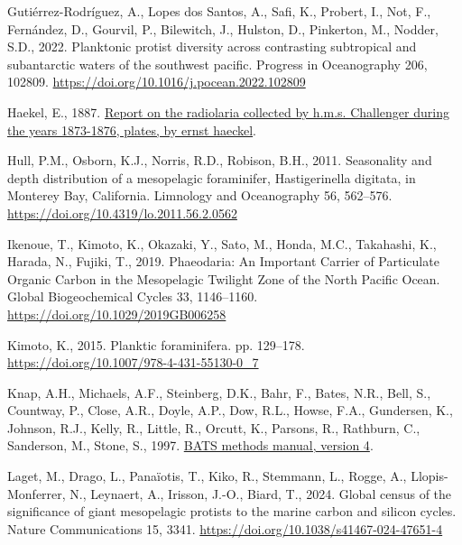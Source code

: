 \documentclass[
]{article}
\newlength{\cslhangindent}
\newlength{\cslentryspacingunit} %
\newenvironment{CSLReferences}[2] %
 {%
  \setlength{\parindent}{0pt}
  \ifodd #1
  \let\oldpar\par
  \def\par{\hangindent=\cslhangindent\oldpar}
  \fi
  \setlength{\parskip}{#2\cslentryspacingunit}
 }%
 {}
\begin{document}
\begin{CSLReferences}{1}{0}
\leavevmode{}%
Gutiérrez-Rodríguez, A., Lopes dos Santos, A., Safi, K., Probert, I.,
Not, F., Fernández, D., Gourvil, P., Bilewitch, J., Hulston, D.,
Pinkerton, M., Nodder, S.D., 2022. Planktonic protist diversity across
contrasting subtropical and subantarctic waters of the southwest
pacific. Progress in Oceanography 206, 102809.
\url{https://doi.org/10.1016/j.pocean.2022.102809}

\leavevmode{}%
Haekel, E., 1887.
\href{https://www.gutenberg.org/cache/epub/44527/pg44527-images.html}{Report
on the radiolaria collected by h.m.s. Challenger during the years
1873-1876, plates, by ernst haeckel}.

\leavevmode{}%
Hull, P.M., Osborn, K.J., Norris, R.D., Robison, B.H., 2011. Seasonality
and depth distribution of a mesopelagic foraminifer, Hastigerinella
digitata, in Monterey Bay, California. Limnology and Oceanography 56,
562--576. \url{https://doi.org/10.4319/lo.2011.56.2.0562}

\leavevmode{}%
Ikenoue, T., Kimoto, K., Okazaki, Y., Sato, M., Honda, M.C., Takahashi,
K., Harada, N., Fujiki, T., 2019. Phaeodaria: An Important Carrier of
Particulate Organic Carbon in the Mesopelagic Twilight Zone of the North
Pacific Ocean. Global Biogeochemical Cycles 33, 1146--1160.
\url{https://doi.org/10.1029/2019GB006258}

\leavevmode{}%
Kimoto, K., 2015. Planktic foraminifera. pp. 129--178.
\url{https://doi.org/10.1007/978-4-431-55130-0_7}

\leavevmode{}%
Knap, A.H., Michaels, A.F., Steinberg, D.K., Bahr, F., Bates, N.R.,
Bell, S., Countway, P., Close, A.R., Doyle, A.P., Dow, R.L., Howse,
F.A., Gundersen, K., Johnson, R.J., Kelly, R., Little, R., Orcutt, K.,
Parsons, R., Rathburn, C., Sanderson, M., Stone, S., 1997.
\href{https://eprints.soton.ac.uk/361194/}{BATS methods manual, version
4}.

\leavevmode{}%
Laget, M., Drago, L., Panaïotis, T., Kiko, R., Stemmann, L., Rogge, A.,
Llopis-Monferrer, N., Leynaert, A., Irisson, J.-O., Biard, T., 2024.
Global census of the significance of giant mesopelagic protists to the
marine carbon and silicon cycles. Nature Communications 15, 3341.
\url{https://doi.org/10.1038/s41467-024-47651-4}


\end{CSLReferences}
\end{document}
